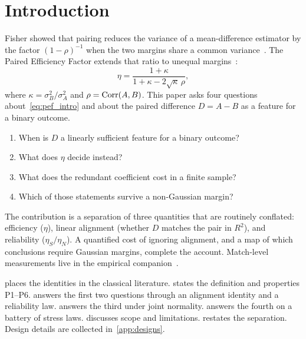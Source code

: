 \section{Introduction}
\label{sec:intro}

Fisher showed that pairing reduces the variance of a mean-difference estimator by the factor $(1-\rho)^{-1}$ when the two margins share a common variance~\parencite{fisher1935}.
The Paired Efficiency Factor extends that ratio to unequal margins~\parencite{brownPEFempirical}:
\begin{equation}
  \eta
  = \frac{1+\kappa}{1+\kappa-2\sqrt{\kappa}\,\rho},
  \label{eq:pef_intro}
\end{equation}
where $\kappa=\sigma_B^2/\sigma_A^2$ and $\rho=\operatorname{Corr}(A,B)$.
This paper asks four questions about~\cref{eq:pef_intro} and about the paired difference $D=A-B$ as a feature for a binary outcome.

\begin{enumerate}
  \item When is $D$ a linearly sufficient feature for a binary outcome?
  \item What does $\eta$ decide instead?
  \item What does the redundant coefficient cost in a finite sample?
  \item Which of those statements survive a non-Gaussian margin?
\end{enumerate}

The contribution is a separation of three quantities that are routinely conflated: efficiency ($\eta$), linear alignment (whether $D$ matches the pair in $R^2$), and reliability ($\eta_S/\eta_N$).
A quantified cost of ignoring alignment, and a map of which conclusions require Gaussian margins, complete the account.
Match-level measurements live in the empirical companion~\parencite{brownPEFempirical}.

 places the identities in the classical literature.
 states the definition and properties P1--P6.
 answers the first two questions through an alignment identity and a reliability law.
 answers the third under joint normality.
 answers the fourth on a battery of stress laws.
 discusses scope and limitations.
 restates the separation.
Design details are collected in~\cref{app:designs}.
